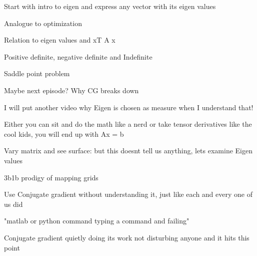 \documentclass{article}
\begin{document}
Start with intro to eigen and express any vector with its eigen values

Analogue to optimization

Relation to eigen values and xT A x

Positive definite, negative definite and Indefinite

Saddle point problem

Maybe next episode?
Why CG breaks down


I will put another video why Eigen is chosen as measure when I understand that!

Either you can sit and do the math like a nerd or take tensor derivatives like the cool kids, you will end up with Ax = b

Vary matrix and see surface: but this doesnt tell us anything, lets examine Eigen values

3b1b prodigy of mapping grids

Use Conjugate gradient without understanding it, just like each and every one of us did

"matlab or python command typing a command and failing"

Conjugate gradient quietly doing its work not disturbing anyone and it hits this point
\end{document}
